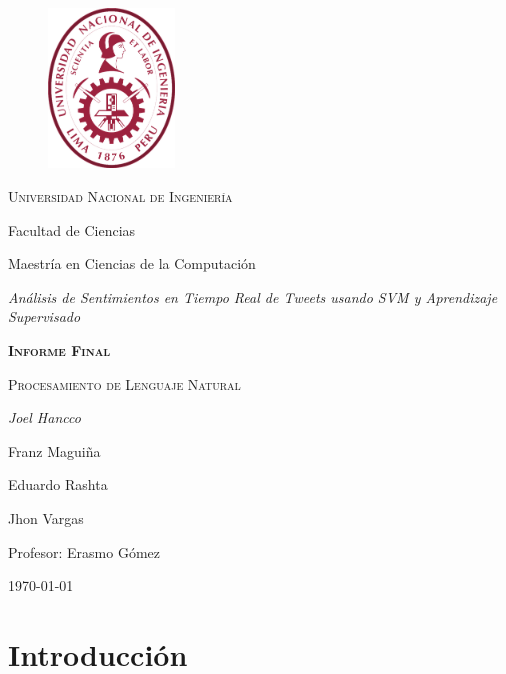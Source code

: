 \documentclass[a4paper,12pt]{article}
\theoremstyle{definition}
\theoremstyle{remark}
\begin{document}
\begin{titlepage}
	\centering
	\begin{figure}[h]
    \centering
    \includegraphics[width=0.3\textwidth]{figures/log_uni.png}
    \end{figure}
    
	{\scshape\huge Universidad Nacional de Ingeniería\par
	\Large Facultad de Ciencias\par
	\large Maestría en Ciencias de la Computación\par}
	\vspace{1cm}
	{\LARGE \itshape Análisis de Sentimientos en Tiempo Real de Tweets usando SVM y Aprendizaje Supervisado\par}
	\vspace{1cm}
	{\scshape\large\textbf{Informe Final}\par}
	{\scshape\large Procesamiento de Lenguaje Natural\par}

    \vspace{.5cm}
	{\large\itshape 
	Joel Hancco\par
	Franz Maguiña\par
	Eduardo Rashta\par
	Jhon Vargas\par\vspace{.5cm}
	Profesor: Erasmo Gómez\par}
    \vspace{.5cm}
	{\large \today\par}
\end{titlepage}

\begin{abstract}
\end{abstract}

\newpage
\tableofcontents
\newpage
\section{Introducción}
\end{document}
